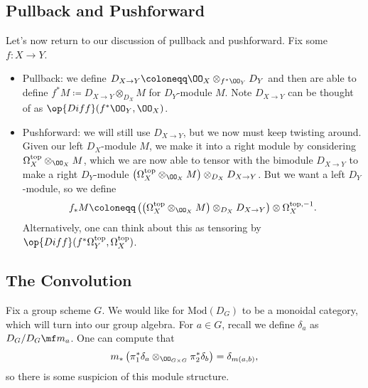 \documentclass{article}
\begin{document}
\subsection{Pullback and Pushforward}
Let's now return to our discussion of pullback and pushforward. Fix some $f\colon X\to Y$.
\begin{itemize}
	\item Pullback: we define $D_{X\to Y}\coloneqq\OO_X\otimes_{f^*\OO_Y}D_Y$ and then are able to define $f^*M\coloneqq D_{X\to Y}\otimes_{D_X}M$ for $D_Y$-module $M$. Note $D_{X\to Y}$ can be thought of as $\op{Diff}(f^*\OO_Y,\OO_X)$.
	\item Pushforward: we will still use $D_{X\to Y}$, but we now must keep twisting around. Given our left $D_X$-module $M$, we make it into a right module by considering $\Omega_X^{\mathrm{top}}\otimes_{\OO_X}M$, which we are now able to tensor with the bimodule $D_{X\to Y}$ to make a right $D_Y$-module $\left(\Omega_X^{\mathrm{top}}\otimes_{\OO_X}M\right)\otimes_{D_X}D_{X\to Y}$. But we want a left $D_Y$-module, so we define
	\[f_*M\coloneqq\left(\left(\Omega_X^{\mathrm{top}}\otimes_{\OO_X}M\right)\otimes_{D_X}D_{X\to Y}\right)\otimes\Omega_X^{\mathrm{top},-1}.\]
	Alternatively, one can think about this as tensoring by $\op{Diff}(f^*\Omega_Y^{\mathrm{top}},\Omega_X^{\mathrm{top}})$.
\end{itemize}

\subsection{The Convolution}
Fix a group scheme $G$. We would like for $\mathrm{Mod}(D_G)$ to be a monoidal category, which will turn into our group algebra. For $a\in G$, recall we define $\delta_a$ as $D_G/D_G\mf m_a$. One can compute that
\[m_*\left(\pi_1^*\delta_a\otimes_{\OO_{G\times G}}\pi_2^*\delta_b\right)=\delta_{m(a,b)},\]
so there is some suspicion of this module structure.
\end{document}
